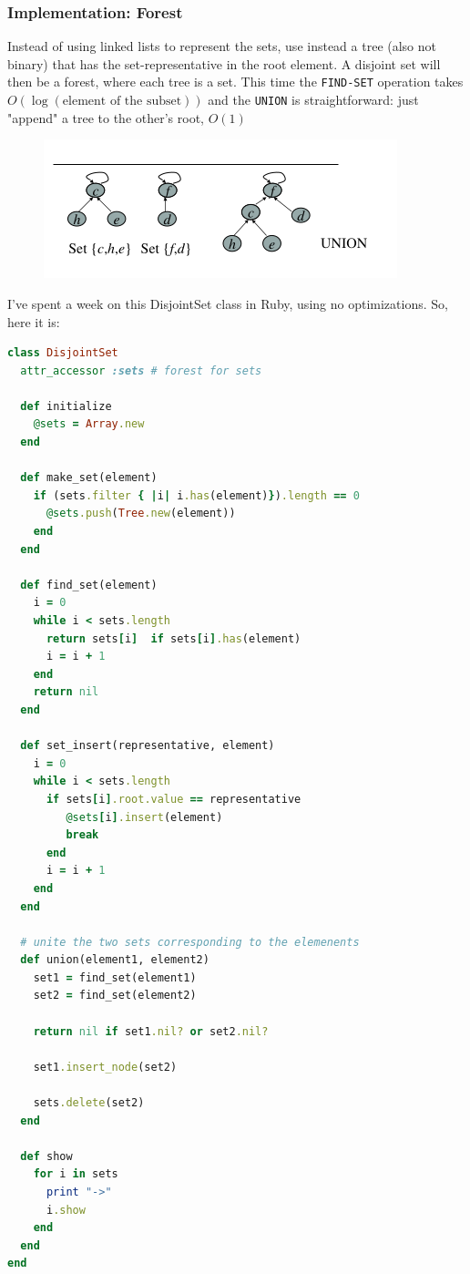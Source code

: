 \documentclass{article}
\begin{document}
			\subsubsection{Implementation: Forest}
				Instead of using linked lists to represent the sets, use instead a tree (also not binary) that has the set-representative in the root element. A disjoint set will then be a forest, where each tree is a set. This time the \verb|FIND-SET| operation takes $O(\log(\text{element of the subset}))$ and the \verb|UNION| is straightforward: just "append" a tree to the other's root, $O(1)$
				\begin{figure}[H]
					\centering
					\includegraphics[width = \textwidth]{images/forestUnion.png}
				\end{figure}
				I've spent a week on this DisjointSet class in Ruby, using no optimizations. So, here it is:
				\begin{lstlisting}[language=Ruby]
class DisjointSet
  attr_accessor :sets # forest for sets

  def initialize
    @sets = Array.new
  end

  def make_set(element)
    if (sets.filter { |i| i.has(element)}).length == 0
      @sets.push(Tree.new(element))
    end
  end

  def find_set(element)
    i = 0
    while i < sets.length
      return sets[i]  if sets[i].has(element)
      i = i + 1
    end
    return nil
  end

  def set_insert(representative, element)
    i = 0
    while i < sets.length
      if sets[i].root.value == representative
         @sets[i].insert(element)
         break
      end
      i = i + 1
    end
  end

  # unite the two sets corresponding to the elemenents
  def union(element1, element2)
    set1 = find_set(element1)
    set2 = find_set(element2)

    return nil if set1.nil? or set2.nil?

    set1.insert_node(set2)

    sets.delete(set2)
  end

  def show
    for i in sets
      print "->"
      i.show
    end
  end
end
				\end{lstlisting}
\end{document}
